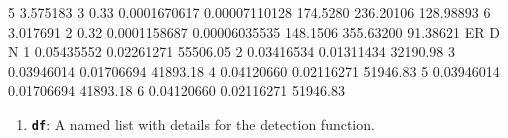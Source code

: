 \documentclass[
]{book}
\newenvironment{Shaded}{\begin{snugshade}}{\end{snugshade}}
\newcommand{\DecValTok}[1]{\textcolor[rgb]{0.00,0.00,0.81}{#1}}
\newcommand{\FloatTok}[1]{\textcolor[rgb]{0.00,0.00,0.81}{#1}}
\newcommand{\NormalTok}[1]{#1}
\newcommand{\OperatorTok}[1]{\textcolor[rgb]{0.81,0.36,0.00}{\textbf{#1}}}
\newcommand{\StringTok}[1]{\textcolor[rgb]{0.31,0.60,0.02}{#1}}
\providecommand{\tightlist}{%
  \setlength{\itemsep}{0pt}\setlength{\parskip}{0pt}}
\begin{document}
\begin{Shaded}
\begin{Highlighting}[]
\DecValTok{5} \FloatTok{3.575183}  \DecValTok{3}   \FloatTok{0.33} \FloatTok{0.0001670617} \FloatTok{0.00007110128}   \FloatTok{174.5280} \FloatTok{236.20106} \FloatTok{128.98893}
\DecValTok{6} \FloatTok{3.017691}  \DecValTok{2}   \FloatTok{0.32} \FloatTok{0.0001158687} \FloatTok{0.00006035535}   \FloatTok{148.1506} \FloatTok{355.63200}  \FloatTok{91.38621}
\NormalTok{          ER          D        N}
\DecValTok{1} \FloatTok{0.05435552} \FloatTok{0.02261271} \FloatTok{55506.05}
\DecValTok{2} \FloatTok{0.03416534} \FloatTok{0.01311434} \FloatTok{32190.98}
\DecValTok{3} \FloatTok{0.03946014} \FloatTok{0.01706694} \FloatTok{41893.18}
\DecValTok{4} \FloatTok{0.04120660} \FloatTok{0.02116271} \FloatTok{51946.83}
\DecValTok{5} \FloatTok{0.03946014} \FloatTok{0.01706694} \FloatTok{41893.18}
\DecValTok{6} \FloatTok{0.04120660} \FloatTok{0.02116271} \FloatTok{51946.83}
\end{Highlighting}
\end{Shaded}

\begin{enumerate}
\def\labelenumi{(\arabic{enumi})}
\setcounter{enumi}{3}
\tightlist
\item
  \textbf{\texttt{df}}: A named list with details for the detection function.
\end{enumerate}

\begin{Shaded}
\end{Shaded}
\end{document}
